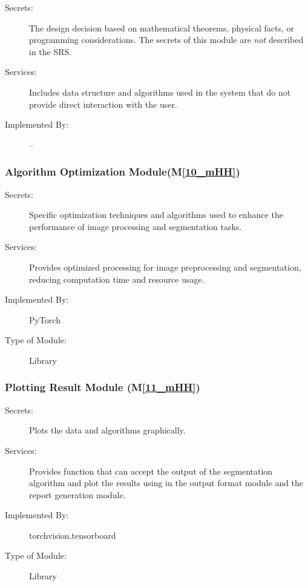 \documentclass[12pt, titlepage]{article}
\newcommand{\mref}[1]{M\ref{#1}}
\begin{document}
\begin{description}
\item[Secrets:] The design decision based on mathematical theorems, physical facts, or programming considerations. The secrets of this module are \emph{not} described in the SRS.
\item[Services:] Includes data structure and algorithms used in the system that
  do not provide direct interaction with the user. 
\item[Implemented By:] --
\end{description}

\subsubsection{Algorithm Optimization Module(\mref{10_mHH})}
\begin{description}
\item[Secrets:]Specific optimization techniques and algorithms used to enhance the performance of image processing and segmentation tasks.
\item[Services:]Provides optimized processing for image preprocessing and segmentation, reducing computation time and resource usage.
\item[Implemented By:] PyTorch
\item[Type of Module:] Library
\end{description}

\subsubsection{Plotting Result Module (\mref{11_mHH})}
\begin{description}
\item[Secrets:] Plots the data and algorithms graphically.
\item[Services:] Provides function that can accept the output of the segmentation algorithm and plot the results using in the output format module and the report generation module. 
\item[Implemented By:] torchvision,tensorboard
\item[Type of Module:] Library
\end{description}
\end{document}

